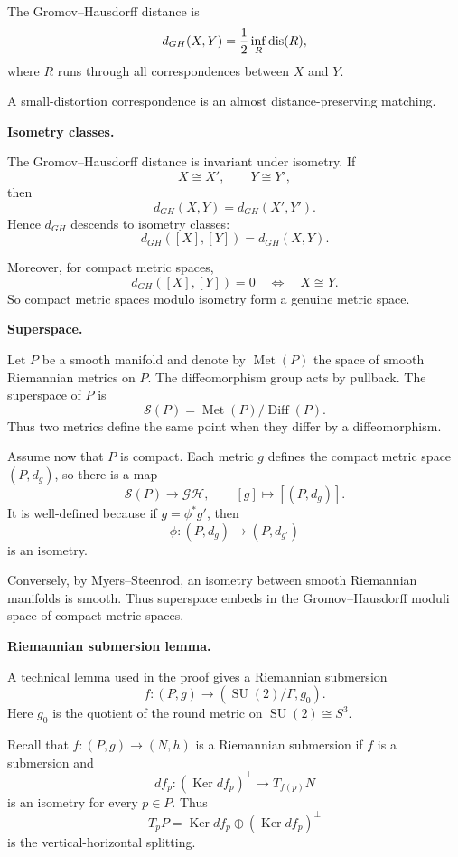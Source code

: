 The Gromov--Hausdorff distance is
$$
        d_{GH}(X,Y)
        =
        {1\over 2}
        \inf_R\operatorname{dis}(R),
$$
where $R$ runs through all
correspondences between $X$ and $Y$.

A small-distortion correspondence is an
almost distance-preserving matching.

\medskip\noindent
{\bf Isometry classes.}

The Gromov--Hausdorff distance is
invariant under isometry.
If
$$
        X\cong X',
        \qquad
        Y\cong Y',
$$
then
$$
        d_{GH}(X,Y)=d_{GH}(X',Y').
$$
Hence $d_{GH}$ descends to isometry
classes:
$$
        d_{GH}([X],[Y])=d_{GH}(X,Y).
$$

Moreover, for compact metric spaces,
$$
        d_{GH}([X],[Y])=0
        \quad\Longleftrightarrow\quad
        X\cong Y.
$$
So compact metric spaces modulo
isometry form a genuine metric space.

\medskip\noindent
{\bf Superspace.}

Let $P$ be a smooth manifold and
denote by $\operatorname{Met}(P)$ the
space of smooth Riemannian metrics on
$P$.
The diffeomorphism group acts by
pullback.
The superspace of $P$ is
$$
        {\mathcal S}(P)
        =
        \operatorname{Met}(P)/
        \operatorname{Diff}(P).
$$
Thus two metrics define the same point
when they differ by a diffeomorphism.

Assume now that $P$ is compact.
Each metric $g$ defines the compact
metric space $(P,d_g)$, so there is a
map
$$
        {\mathcal S}(P)\to{\mathcal{GH}},
        \qquad
        [g]\mapsto[(P,d_g)].
$$
It is well-defined because if
$g=\phi^*g'$, then
$$
        \phi:(P,d_g)\to(P,d_{g'})
$$
is an isometry.

Conversely, by Myers--Steenrod, an
isometry between smooth Riemannian
manifolds is smooth.
Thus superspace embeds in the
Gromov--Hausdorff moduli space of
compact metric spaces.

\medskip\noindent
{\bf Riemannian submersion lemma.}

A technical lemma used in the proof
gives a Riemannian submersion
$$
        f:(P,g)\to
        (\operatorname{SU}(2)/\Gamma,g_0).
$$
Here $g_0$ is the quotient of the
round metric on
$\operatorname{SU}(2)\cong S^3$.

Recall that
$f:(P,g)\to(N,h)$ is a Riemannian
submersion if $f$ is a submersion and
$$
        df_p:
        (\operatorname{Ker}df_p)^\perp
        \to T_{f(p)}N
$$
is an isometry for every $p\in P$.
Thus
$$
        T_pP
        =
        \operatorname{Ker}df_p
        \oplus
        (\operatorname{Ker}df_p)^\perp
$$
is the vertical-horizontal splitting.

